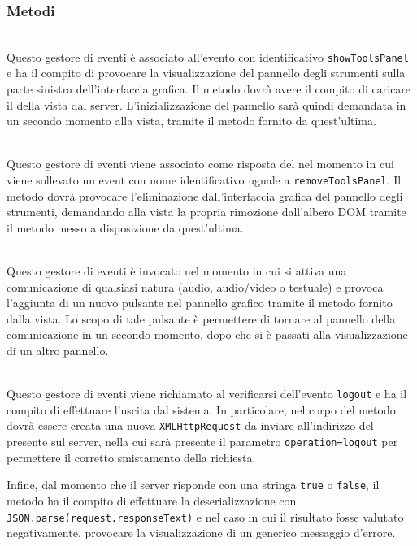 \subsubsection*{Metodi}
\begin{description}
  \item{}\\
  Questo gestore di eventi è associato all'evento con identificativo \texttt{showToolsPanel} e ha il compito di provocare la visualizzazione del pannello degli strumenti sulla parte sinistra dell'interfaccia grafica. Il metodo dovrà avere il compito di caricare il  della vista dal server. L'inizializzazione del pannello sarà quindi demandata in un secondo momento alla vista, tramite il metodo  fornito da quest'ultima.
  
  \item{}\\
  Questo gestore di eventi viene associato come risposta del  nel momento in cui viene sollevato un event con nome identificativo uguale a \verb'removeToolsPanel'. Il metodo dovrà provocare l'eliminazione dall'interfaccia grafica del pannello degli strumenti, demandando alla vista la propria rimozione dall'albero DOM tramite il metodo  messo a disposizione da quest'ultima.
  
  \item{}\\
  Questo gestore di eventi è invocato nel momento in cui si attiva una comunicazione di qualsiasi natura (audio, audio/video o testuale) e provoca l'aggiunta di un nuovo pulsante nel pannello grafico tramite il metodo  fornito dalla vista. Lo scopo di tale pulsante è permettere di tornare al pannello della comunicazione in un secondo momento, dopo che si è passati alla visualizzazione di un altro pannello.
  
  \item{}\\
  Questo gestore di eventi viene richiamato al verificarsi dell'evento \verb'logout' e ha il compito di effettuare l'uscita dal sistema. In particolare, nel corpo del metodo dovrà essere creata una nuova \verb'XMLHttpRequest' da inviare all'indirizzo del  presente sul server, nella cui  sarà presente il parametro \verb'operation=logout' per permettere il corretto smistamento della richiesta.
  
  Infine, dal momento che il server risponde con una stringa \verb'true' o \verb'false', il metodo ha il compito di effettuare la deserializzazione con \verb'JSON.parse(request.responseText)' e nel caso in cui il risultato fosse valutato negativamente, provocare la visualizzazione di un generico messaggio d'errore.
\end{description}

